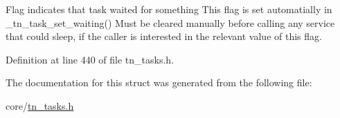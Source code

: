 Flag indicates that task waited for something This flag is set automatially in {\ttfamily \+\_\+tn\+\_\+task\+\_\+set\+\_\+waiting()} Must be cleared manually before calling any service that could sleep, if the caller is interested in the relevant value of this flag. 



Definition at line 440 of file tn\+\_\+tasks.\+h.



The documentation for this struct was generated from the following file\+:\begin{DoxyCompactItemize}
\item 
core/\hyperlink{tn__tasks_8h}{tn\+\_\+tasks.\+h}\end{DoxyCompactItemize}
